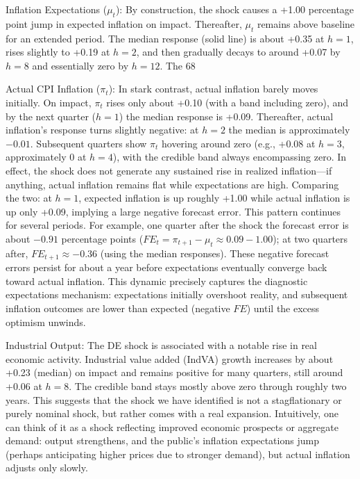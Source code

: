 \documentclass[12pt]{article}
\begin{document}
Inflation Expectations ($\mu_t$): By construction, the shock causes a +1.00 percentage point jump in expected inflation on impact. Thereafter, $\mu_t$ remains above baseline for an extended period. The median response (solid line) is about +0.35 at $h=1$, rises slightly to +0.19 at $h=2$, and then gradually decays to around +0.07 by $h=8$ and essentially zero by $h=12$. The 68%

Actual CPI Inflation ($\pi_t$): In stark contrast, actual inflation barely moves initially. On impact, $\pi_t$ rises only about +0.10 (with a band including zero), and by the next quarter ($h=1$) the median response is +0.09. Thereafter, actual inflation's response turns slightly negative: at $h=2$ the median is approximately $-0.01$. Subsequent quarters show $\pi_t$ hovering around zero (e.g., +0.08 at $h=3$, approximately 0 at $h=4$), with the credible band always encompassing zero. In effect, the shock does not generate any sustained rise in realized inflation---if anything, actual inflation remains flat while expectations are high. Comparing the two: at $h=1$, expected inflation is up roughly +1.00 while actual inflation is up only +0.09, implying a large negative forecast error. This pattern continues for several periods. For example, one quarter after the shock the forecast error is about $-0.91$ percentage points ($FE_t = \pi_{t+1}-\mu_t \approx 0.09 - 1.00$); at two quarters after, $FE_{t+1} \approx -0.36$ (using the median responses). These negative forecast errors persist for about a year before expectations eventually converge back toward actual inflation. This dynamic precisely captures the diagnostic expectations mechanism: expectations initially overshoot reality, and subsequent inflation outcomes are lower than expected (negative $FE$) until the excess optimism unwinds.

Industrial Output: The DE shock is associated with a notable rise in real economic activity. Industrial value added (IndVA) growth increases by about +0.23 (median) on impact and remains positive for many quarters, still around +0.06 at $h=8$. The credible band stays mostly above zero through roughly two years. This suggests that the shock we have identified is not a stagflationary or purely nominal shock, but rather comes with a real expansion. Intuitively, one can think of it as a shock reflecting improved economic prospects or aggregate demand: output strengthens, and the public's inflation expectations jump (perhaps anticipating higher prices due to stronger demand), but actual inflation adjusts only slowly.
\end{document}
